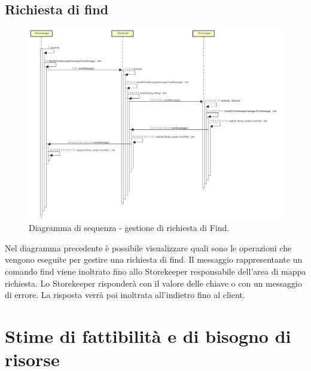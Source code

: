 \documentclass[a4paper]{article}
\begin{document}
        \subsection{Richiesta di find}
            \begin{figure} [H]
				\centering
				\includegraphics[width=\textwidth]{ST/Sequenza/seqFind.jpg}
				\caption{Diagramma di sequenza - gestione di richiesta di Find.}
			\end{figure}
            Nel diagramma precedente è possibile visualizzare quali sono le operazioni che vengono eseguite per gestire una richiesta di find. Il messaggio rappresentante un comando find viene inoltrato fino allo Storekeeper responsabile dell'area di mappa richiesta. Lo Storekeeper risponderà con il valore delle chiave o con un messaggio di errore. La risposta verrà poi inoltrata all'indietro fino al client.            
        
	\newpage 
	\section{Stime di fattibilità e di bisogno di risorse}
	
\end{document}
